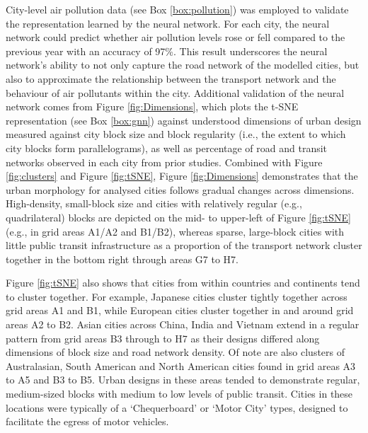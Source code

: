 \documentclass[preprint,10pt]{elsarticle} %
\begin{document}
City-level air pollution data (see Box \ref{box:pollution}) was employed to validate the representation learned by the neural network. For each city, the neural network could predict whether air pollution levels rose or fell compared to the previous year with an accuracy of 97\%. This result underscores the neural network's ability to not only capture the road network of the modelled cities, but also to approximate the relationship between the transport network and the behaviour of air pollutants within the city. Additional validation of the neural network comes from Figure \ref{fig:Dimensions}, which plots the t-SNE representation (see Box \ref{box:gnn}) against understood dimensions of urban design measured against city block size and block regularity (i.e., the extent to which city blocks form parallelograms), as well as percentage of road and transit networks observed in each city from prior studies\cite{Thompson2020,Nice2019b}. Combined with Figure \ref{fig:clusters} and Figure \ref{fig:tSNE}, Figure \ref{fig:Dimensions} demonstrates that the urban morphology for analysed cities follows gradual changes across dimensions. High-density, small-block size and cities with relatively regular (e.g., quadrilateral) blocks are depicted on the mid- to upper-left of Figure \ref{fig:tSNE} (e.g., in grid areas A1/A2 and B1/B2), whereas sparse, large-block cities with little public transit infrastructure as a proportion of the transport network cluster together in the bottom right through areas G7 to H7. 

Figure \ref{fig:tSNE} also shows that cities from within countries and continents tend to cluster together. For example, Japanese cities cluster tightly together across grid areas A1 and B1, while European cities cluster together in and around grid areas A2 to B2. Asian cities across China, India and Vietnam extend in a regular pattern from grid areas B3 through to H7 as their designs differed along dimensions of block size and road network density. Of note are also clusters of Australasian, South American and North American cities found in grid areas A3 to A5 and B3 to B5. Urban designs in these areas tended to demonstrate regular, medium-sized blocks with medium to low levels of public transit. Cities in these locations were typically of a `Chequerboard' or `Motor City' types, designed to facilitate the egress of motor vehicles.
\end{document}
